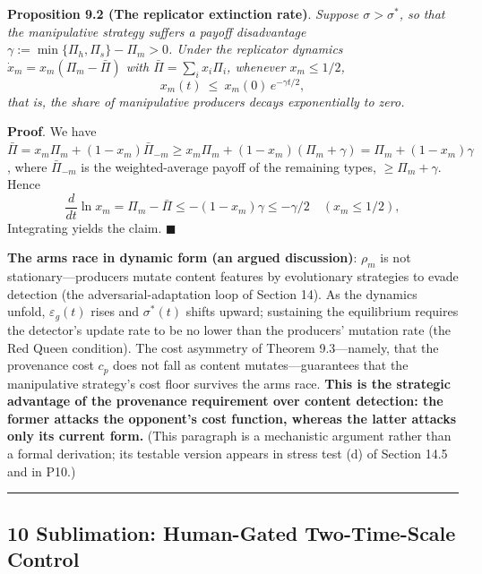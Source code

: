 \documentclass[
  11pt]{article}
\begin{document}
\textbf{Proposition 9.2 (The replicator extinction rate)}. \emph{Suppose
\(\sigma > \sigma^*\), so that the manipulative strategy suffers a
payoff disadvantage \(\gamma := \min\{\Pi_h, \Pi_s\} - \Pi_m > 0\).
Under the replicator dynamics \(\dot x_m = x_m(\Pi_m - \bar\Pi)\) with
\(\bar\Pi = \sum_i x_i \Pi_i\), whenever \(x_m \le 1/2\),}
\[x_m(t) \ \le\ x_m(0)\, e^{-\gamma t/2},\] \emph{that is, the share of
manipulative producers decays exponentially to zero.}

\textbf{Proof}. We have
\(\bar\Pi = x_m \Pi_m + (1-x_m)\bar\Pi_{-m} \ge x_m\Pi_m + (1-x_m)(\Pi_m + \gamma) = \Pi_m + (1-x_m)\gamma\),
where \(\bar\Pi_{-m}\) is the weighted-average payoff of the remaining
types, \(\ge \Pi_m + \gamma\). Hence
\[\frac{d}{dt}\ln x_m = \Pi_m - \bar\Pi \le -(1-x_m)\gamma \le -\gamma/2 \quad (x_m \le 1/2),\]
Integrating yields the claim. \(\blacksquare\)

\textbf{The arms race in dynamic form (an argued discussion)}:
\(\rho_m\) is not stationary---producers mutate content features by
evolutionary strategies to evade detection (the adversarial-adaptation
loop of Section 14). As the dynamics unfold, \(\varepsilon_g(t)\) rises
and \(\sigma^*(t)\) shifts upward; sustaining the equilibrium requires
the detector's update rate to be no lower than the producers' mutation
rate (the Red Queen condition). The cost asymmetry of Theorem
9.3---namely, that the provenance cost \(c_p\) does not fall as content
mutates---guarantees that the manipulative strategy's cost floor
survives the arms race. \textbf{This is the strategic advantage of the
provenance requirement over content detection: the former attacks the
opponent's cost function, whereas the latter attacks only its current
form.} (This paragraph is a mechanistic argument rather than a formal
derivation; its testable version appears in stress test (d) of Section
14.5 and in P10.)

\begin{center}\rule{0.5\linewidth}{0.5pt}\end{center}

\subsection{10 Sublimation: Human-Gated Two-Time-Scale
Control}\label{sublimation-human-gated-two-time-scale-control}
\end{document}
